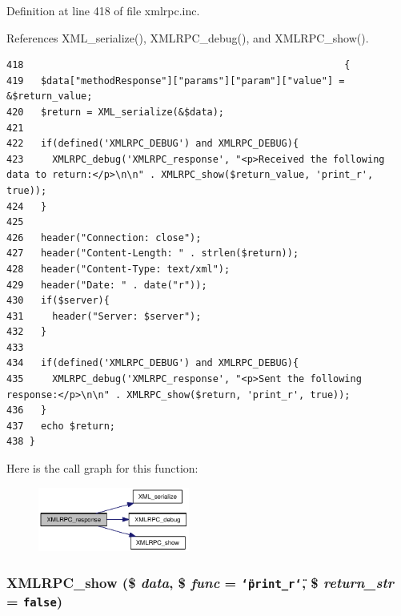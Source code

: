 Definition at line 418 of file xmlrpc.inc.

References XML\_\-serialize(), XMLRPC\_\-debug(), and XMLRPC\_\-show().

\begin{Code}\begin{verbatim}418                                                        {
419   $data["methodResponse"]["params"]["param"]["value"] = &$return_value;
420   $return = XML_serialize(&$data);
421 
422   if(defined('XMLRPC_DEBUG') and XMLRPC_DEBUG){
423     XMLRPC_debug('XMLRPC_response', "<p>Received the following data to return:</p>\n\n" . XMLRPC_show($return_value, 'print_r', true));
424   }
425 
426   header("Connection: close");
427   header("Content-Length: " . strlen($return));
428   header("Content-Type: text/xml");
429   header("Date: " . date("r"));
430   if($server){
431     header("Server: $server");
432   }
433 
434   if(defined('XMLRPC_DEBUG') and XMLRPC_DEBUG){
435     XMLRPC_debug('XMLRPC_response', "<p>Sent the following response:</p>\n\n" . XMLRPC_show($return, 'print_r', true));
436   }
437   echo $return;
438 }
\end{verbatim}
\end{Code}




Here is the call graph for this function:\nopagebreak
\begin{figure}[H]
\begin{center}
\leavevmode
\includegraphics[width=141pt]{xmlrpc_8inc_c736d378caaccdd0726ea1080d1f526f_cgraph}
\end{center}
\end{figure}
\hypertarget{xmlrpc_8inc_1f60d2672bcb35f5ff908f64931f8d48}{
\subsubsection{\setlength{\rightskip}{0pt plus 5cm}XMLRPC\_\-show (\$ {\em data}, \$ {\em func} = {\tt \char`\"{}print\_\-r\char`\"{}}, \$ {\em return\_\-str} = {\tt false})}}
\label{xmlrpc_8inc_1f60d2672bcb35f5ff908f64931f8d48}




